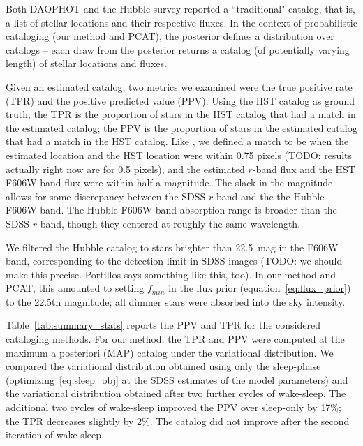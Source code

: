 Both DAOPHOT and the Hubble survey reported a ``traditional" catalog, that is, a list of stellar locations and their respective fluxes.
In the context of probabilistic cataloging (our method and PCAT), the posterior 
defines a distribution over catalogs -- each draw from the posterior returns a catalog 
(of potentially varying length) of stellar locations and fluxes. 

Given an estimated catalog, two metrics we examined were the true positive rate (TPR) and the positive predicted value (PPV). Using the HST catalog as ground truth, the TPR is the proportion of stars in the HST catalog that had a match in the estimated catalog;
the PPV is the proportion of stars in the estimated catalog that had a match in the HST catalog. Like \cite{Portillo_2017, Feder_2019}, we defined a match to be when the estimated location and the HST location were within 0.75 pixels
(TODO: results actually right now are for 0.5 pixels),
and the estimated $r$-band flux and the HST F606W band flux were within half a
magnitude. The slack in the magnitude allows for some discrepancy between the 
SDSS $r$-band and the the Hubble F606W band. The Hubble F606W band absorption range is broader than the SDSS $r$-band, though they centered at roughly the same wavelength. 

We filtered the Hubble catalog to stars brighter than 22.5~mag in the F606W band, corresponding to the detection limit in SDSS images  
(TODO: we should make this precise. Portillos says something like this, too). In our method and PCAT, this amounted to setting $f_{min}$ in the flux prior (equation~\ref{eq:flux_prior})
to the 22.5th magnitude; all dimmer stars were absorbed into the sky intensity. 

Table~\ref{tab:summary_stats} reports the PPV and TPR for the considered cataloging methods.
For our method, the TPR and PPV were computed at the maximum a posteriori (MAP) catalog under
the variational distribution. 
We compared the variational distribution obtained using only the sleep-phase (optimizing~\eqref{eq:sleep_obj} at the SDSS estimates of the model parameters)
and the variational distribution obtained after two further cycles of wake-sleep. The additional two cycles of wake-sleep improved the PPV 
over sleep-only by 17\%; the TPR decreases slightly by 2\%. 
The catalog did not improve after the second iteration of wake-sleep. 

